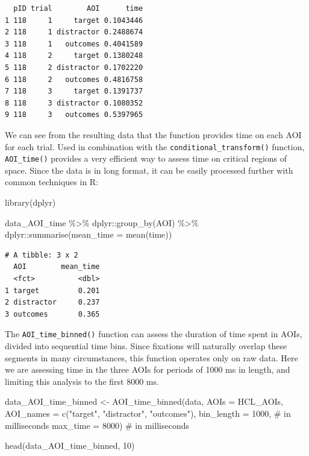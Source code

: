 \documentclass[
  man,
  floatsintext,
  longtable,
  nolmodern,
  notxfonts,
  notimes,
  colorlinks=true,linkcolor=blue,citecolor=blue,urlcolor=blue]{apa7}
\newenvironment{Shaded}{\begin{snugshade}}{\end{snugshade}}
\newcommand{\AttributeTok}[1]{\textcolor[rgb]{0.40,0.45,0.13}{#1}}
\newcommand{\CommentTok}[1]{\textcolor[rgb]{0.37,0.37,0.37}{#1}}
\newcommand{\DecValTok}[1]{\textcolor[rgb]{0.68,0.00,0.00}{#1}}
\newcommand{\FunctionTok}[1]{\textcolor[rgb]{0.28,0.35,0.67}{#1}}
\newcommand{\NormalTok}[1]{\textcolor[rgb]{0.00,0.23,0.31}{#1}}
\newcommand{\OtherTok}[1]{\textcolor[rgb]{0.00,0.23,0.31}{#1}}
\newcommand{\SpecialCharTok}[1]{\textcolor[rgb]{0.37,0.37,0.37}{#1}}
\newcommand{\StringTok}[1]{\textcolor[rgb]{0.13,0.47,0.30}{#1}}
\begin{document}
\begin{verbatim}
  pID trial        AOI      time
1 118     1     target 0.1043446
2 118     1 distractor 0.2488674
3 118     1   outcomes 0.4041589
4 118     2     target 0.1380248
5 118     2 distractor 0.1702220
6 118     2   outcomes 0.4816758
7 118     3     target 0.1391737
8 118     3 distractor 0.1080352
9 118     3   outcomes 0.5397965
\end{verbatim}

We can see from the resulting data that the function provides time on
each AOI for each trial. Used in combination with the
\texttt{conditional\_transform()} function, \texttt{AOI\_time()}
provides a very efficient way to assess time on critical regions of
space. Since the data is in long format, it can be easily processed
further with common techniques in R:

\begin{Shaded}
\begin{Highlighting}[]
\FunctionTok{library}\NormalTok{(dplyr)}

\NormalTok{data\_AOI\_time }\SpecialCharTok{\%\textgreater{}\%} 
\NormalTok{  dplyr}\SpecialCharTok{::}\FunctionTok{group\_by}\NormalTok{(AOI) }\SpecialCharTok{\%\textgreater{}\%} 
\NormalTok{  dplyr}\SpecialCharTok{::}\FunctionTok{summarise}\NormalTok{(}\AttributeTok{mean\_time =} \FunctionTok{mean}\NormalTok{(time))}
\end{Highlighting}
\end{Shaded}

\begin{verbatim}
# A tibble: 3 x 2
  AOI        mean_time
  <fct>          <dbl>
1 target         0.201
2 distractor     0.237
3 outcomes       0.365
\end{verbatim}

The \texttt{AOI\_time\_binned()} function can assess the duration of
time spent in AOIs, divided into sequential time bins. Since fixations
will naturally overlap these segments in many circumstances, this
function operates only on raw data. Here we are assessing time in the
three AOIs for periods of 1000 ms in length, and limiting this analysis
to the first 8000 ms.

\begin{Shaded}
\begin{Highlighting}[]
\NormalTok{data\_AOI\_time\_binned }\OtherTok{\textless{}{-}} 
  \FunctionTok{AOI\_time\_binned}\NormalTok{(data, }
                  \AttributeTok{AOIs =}\NormalTok{ HCL\_AOIs,}
                  \AttributeTok{AOI\_names =} \FunctionTok{c}\NormalTok{(}\StringTok{"target"}\NormalTok{, }\StringTok{"distractor"}\NormalTok{, }\StringTok{"outcomes"}\NormalTok{),}
                  \AttributeTok{bin\_length =} \DecValTok{1000}\NormalTok{, }\CommentTok{\# in milliseconds}
                  \AttributeTok{max\_time =} \DecValTok{8000}\NormalTok{) }\CommentTok{\# in milliseconds}

\FunctionTok{head}\NormalTok{(data\_AOI\_time\_binned, }\DecValTok{10}\NormalTok{)}
\end{Highlighting}
\end{Shaded}
\end{document}
